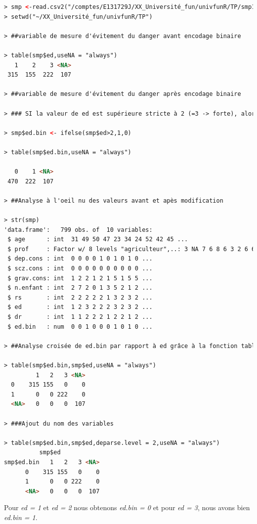 \begin{lstlisting}[language=html]
> smp <-read.csv2("/comptes/E131729J/XX_Université_fun/univfunR/TP/smp1.csv")
> setwd("~/XX_Université_fun/univfunR/TP")

> ##variable de mesure d'évitement du danger avant encodage binaire

> table(smp$ed,useNA = "always")
   1    2    3 <NA> 
 315  155  222  107 

> ##variable de mesure d'évitement du danger après encodage binaire

> ### SI la valeur de ed est supérieure stricte à 2 (=3 -> forte), alors smp$ed.bin[i] = 1, sinon smp$ed.bin[i]=0

> smp$ed.bin <- ifelse(smp$ed>2,1,0)

> table(smp$ed.bin,useNA = "always")

   0    1 <NA> 
 470  222  107 

> ##Analyse à l'oeil nu des valeurs avant et apès modification

> str(smp)
'data.frame':	799 obs. of  10 variables:
 $ age      : int  31 49 50 47 23 34 24 52 42 45 ...
 $ prof     : Factor w/ 8 levels "agriculteur",..: 3 NA 7 6 8 6 3 2 6 6 ...
 $ dep.cons : int  0 0 0 0 1 0 1 0 1 0 ...
 $ scz.cons : int  0 0 0 0 0 0 0 0 0 0 ...
 $ grav.cons: int  1 2 2 1 2 1 5 1 5 5 ...
 $ n.enfant : int  2 7 2 0 1 3 5 2 1 2 ...
 $ rs       : int  2 2 2 2 2 1 3 2 3 2 ...
 $ ed       : int  1 2 3 2 2 2 3 2 3 2 ...
 $ dr       : int  1 1 2 2 2 1 2 2 1 2 ...
 $ ed.bin   : num  0 0 1 0 0 0 1 0 1 0 ...

> ##Analyse croisée de ed.bin par rapport à ed grâce à la fonction table :

> table(smp$ed.bin,smp$ed,useNA = "always")      
         1   2   3 <NA>
  0    315 155   0    0
  1      0   0 222    0
  <NA>   0   0   0  107
  
> ###Ajout du nom des variables

> table(smp$ed.bin,smp$ed,deparse.level = 2,useNA = "always")
          smp$ed
smp$ed.bin   1   2   3 <NA>
      0    315 155   0    0
      1      0   0 222    0
      <NA>   0   0   0  107
\end{lstlisting}

Pour \textit{ed = 1} et \textit{ed = 2} nous obtenons \textit{ed.bin = 0} et pour \textit{ed = 3}, nous avons bien \textit{ed.bin = 1}.\newline

